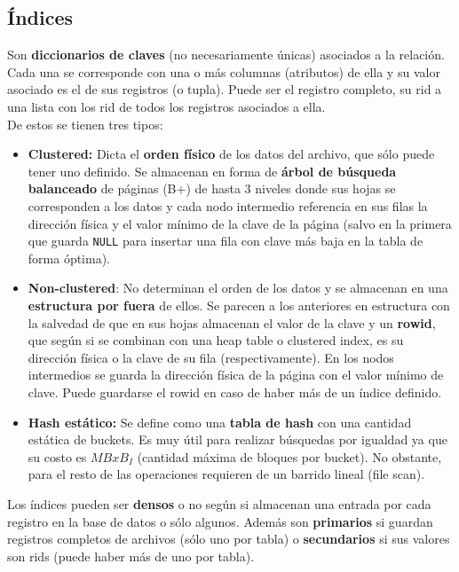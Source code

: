 \subsection*{Índices}
Son \textbf{diccionarios de claves} (no necesariamente únicas) asociados a la relación. Cada una se corresponde con una o más columnas (atributos) de ella y su valor asociado es el de sus registros (o tupla). Puede ser el registro completo, su rid a una lista con los rid de todos los registros asociados a ella. \\
De estos se tienen tres tipos:
\begin{itemize}
    \item \textbf{Clustered:} Dicta el \textbf{orden físico} de los datos del archivo, que sólo puede tener uno definido. Se almacenan en forma de \textbf{árbol de búsqueda balanceado} de páginas (B+) de hasta 3 niveles donde sus hojas se corresponden a los datos y cada nodo intermedio referencia en sus filas la dirección física y el valor mínimo de la clave de la página (salvo en la primera que guarda \texttt{NULL} para insertar una fila con clave más baja en la tabla de forma óptima).
    \item \textbf{Non-clustered}: No determinan el orden de los datos y se almacenan en una \textbf{estructura por fuera} de ellos. Se parecen a los anteriores en estructura con la salvedad de que en sus hojas almacenan el valor de la clave y un \textbf{rowid}, que según si se combinan con una heap table o clustered index, es su dirección física o la clave de su fila (respectivamente). En los nodos intermedios se guarda la dirección física de la página con el valor mínimo de clave. Puede guardarse el rowid en caso de haber más de un índice definido.
    \item \textbf{Hash estático:} Se define como una \textbf{tabla de hash} con una cantidad estática de buckets. Es muy útil para realizar búsquedas por igualdad ya que su costo es $MBxB_I$ (cantidad máxima de bloques por bucket). No obstante, para el resto de las operaciones requieren de un barrido lineal (file scan).
\end{itemize}
Los índices pueden ser \textbf{densos} o no según si almacenan una entrada por cada registro en la base de datos o sólo algunos. Además son \textbf{primarios} si guardan registros completos de archivos (sólo uno por tabla) o \textbf{secundarios} si sus valores son rids (puede haber más de uno por tabla).

